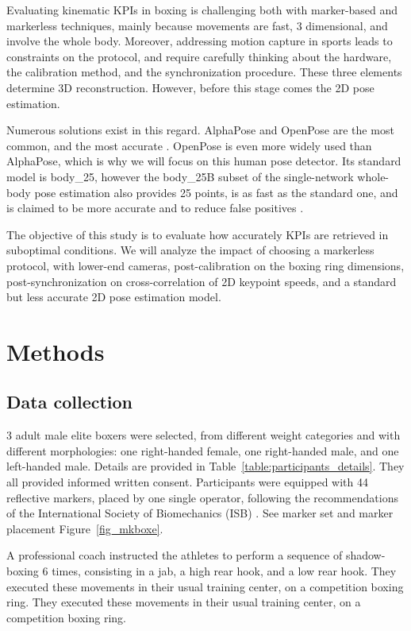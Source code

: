 Evaluating kinematic KPIs in boxing is challenging both with marker-based and markerless techniques, mainly because movements are fast, 3 dimensional, and involve the whole body. Moreover, addressing motion capture in sports leads to constraints on the protocol, and require carefully thinking about the hardware, the calibration method, and the synchronization procedure. These three elements determine 3D reconstruction. However, before this stage comes the 2D pose estimation. 

Numerous solutions exist in this regard. AlphaPose \cite{Fang2017} and OpenPose \cite{Cao2019} are the most common, and the most accurate \cite{Needham2021b,Mroz2021}. OpenPose is even more widely used than AlphaPose, which is why we will focus on this human pose detector. Its standard model is body\_25, however the body\_25B subset of the single-network whole-body pose estimation \cite{Hidalgo2019} also provides 25 points, is as fast as the standard one, and is claimed to be more accurate and to reduce false positives \cite{Hidalgo2019,Pagnon2021}. 

The objective of this study is to evaluate how accurately KPIs are retrieved in suboptimal conditions. We will analyze the impact of choosing a markerless protocol, with lower-end cameras, post-calibration on the boxing ring dimensions, post-synchronization on cross-correlation of 2D keypoint speeds, and a standard but less accurate 2D pose estimation model. 


\section{Methods}
\subsection{Data collection}
3 adult male elite boxers were selected, from different weight categories and with different morphologies: one right-handed female, one right-handed male, and one left-handed male. Details are provided in Table~\ref{table:participants_details}. They all provided informed written consent. Participants were equipped with 44 reflective markers, placed by one single operator, following the recommendations of the International Society of Biomechanics (ISB) \cite{Wu2002, Wu2005}. See marker set and marker placement Figure~\ref{fig_mkboxe}.

A professional coach instructed the athletes to perform a sequence of shadow-boxing 6 times, consisting in a jab, a high rear hook, and a low rear hook. They executed these movements in their usual training center, on a competition boxing ring. They executed these movements in their usual training center, on a competition boxing ring. 

